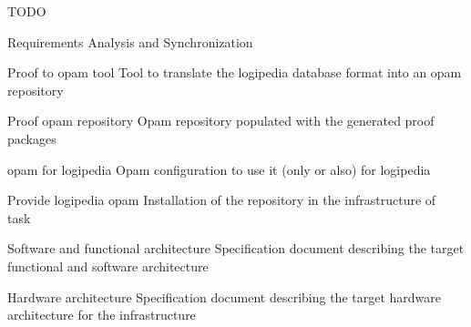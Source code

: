 \begin{workpackage}[id=access,wphases=0-48,type=MGT,
  short=Access,%
  title={Access to the infrastructure},
  lead=Inr,
  InrRM=28,%
  OcaRM=6]
\begin{tasklist}
  \begin{task}[id=edukera,
      title=Web interface for doing proofs at school,
      lead=Edu,EduRM=12]

    TODO
  \end{task}

\end{tasklist}

\begin{wpdelivs}
  \begin{wpdeliv}[due=3,miles=startup,id=requirements,dissem=PU,nature=DEM,lead=Inr]{Requirements Analysis and Synchronization}
  \end{wpdeliv}

  \begin{wpdeliv}[due=2,miles=???,id=acessopamtool,dissem=PU,nature=DEM,lead=Oca]{Proof to opam tool}
    Tool to translate the logipedia database format into an opam repository
  \end{wpdeliv}

  \begin{wpdeliv}[due=2,miles=???,id=acessopamrepo,dissem=PU,nature=DEM,lead=Oca]{Proof opam repository}
    Opam repository populated with the generated proof packages
  \end{wpdeliv}

  \begin{wpdeliv}[due=1,miles=???,id=accessopamconfig,dissem=PU,nature=DEM,lead=Oca]{opam for logipedia}
    Opam configuration to use it (only or also) for logipedia
  \end{wpdeliv}

  \begin{wpdeliv}[due=1,miles=???,id=accessopam,dissem=PU,nature=DEM,lead=Oca]{Provide logipedia opam}
    Installation of the repository in the infrastructure of task~
  \end{wpdeliv}

  \begin{wpdeliv}[due=18,miles=???,id=archi-spec,dissem=PU,nature=R,lead=Irt]{Software and functional architecture}
    Specification document describing the target functional and software architecture
  \end{wpdeliv}
  
  \begin{wpdeliv}[due=20,miles=???,id=infra-spec,dissem=PU,nature=R,lead=Irt]{Hardware architecture}
    Specification document describing the target hardware architecture for the infrastructure
  \end{wpdeliv}
  

\end{wpdelivs}
\end{workpackage}
